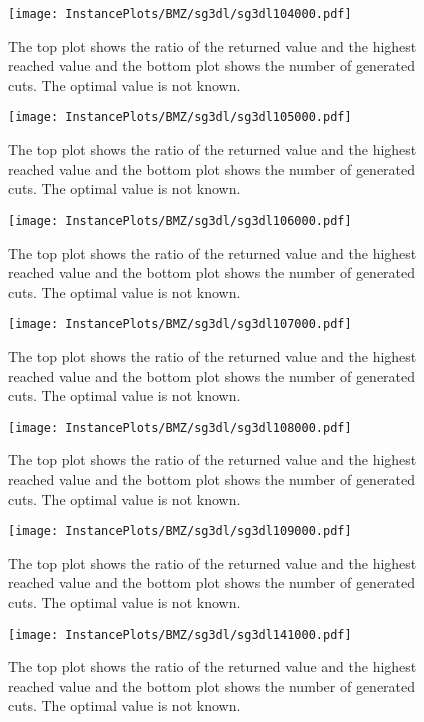 \documentclass[10pt,a4paper]{article}
\begin{document}
\begin{figure}[H]
\texttt{[image: InstancePlots/BMZ/sg3dl/sg3dl104000.pdf]}
\caption{The top plot shows the ratio of the returned value and the highest reached value     and the bottom plot shows the number of generated cuts. The optimal value is not known.}
\end{figure}

\begin{figure}[H]
\texttt{[image: InstancePlots/BMZ/sg3dl/sg3dl105000.pdf]}
\caption{The top plot shows the ratio of the returned value and the highest reached value     and the bottom plot shows the number of generated cuts. The optimal value is not known.}
\end{figure}

\begin{figure}[H]
\texttt{[image: InstancePlots/BMZ/sg3dl/sg3dl106000.pdf]}
\caption{The top plot shows the ratio of the returned value and the highest reached value     and the bottom plot shows the number of generated cuts. The optimal value is not known.}
\end{figure}

\begin{figure}[H]
\texttt{[image: InstancePlots/BMZ/sg3dl/sg3dl107000.pdf]}
\caption{The top plot shows the ratio of the returned value and the highest reached value     and the bottom plot shows the number of generated cuts. The optimal value is not known.}
\end{figure}

\begin{figure}[H]
\texttt{[image: InstancePlots/BMZ/sg3dl/sg3dl108000.pdf]}
\caption{The top plot shows the ratio of the returned value and the highest reached value     and the bottom plot shows the number of generated cuts. The optimal value is not known.}
\end{figure}

\begin{figure}[H]
\texttt{[image: InstancePlots/BMZ/sg3dl/sg3dl109000.pdf]}
\caption{The top plot shows the ratio of the returned value and the highest reached value     and the bottom plot shows the number of generated cuts. The optimal value is not known.}
\end{figure}

\begin{figure}[H]
\texttt{[image: InstancePlots/BMZ/sg3dl/sg3dl141000.pdf]}
\caption{The top plot shows the ratio of the returned value and the highest reached value     and the bottom plot shows the number of generated cuts. The optimal value is not known.}
\end{figure}
\end{document}
